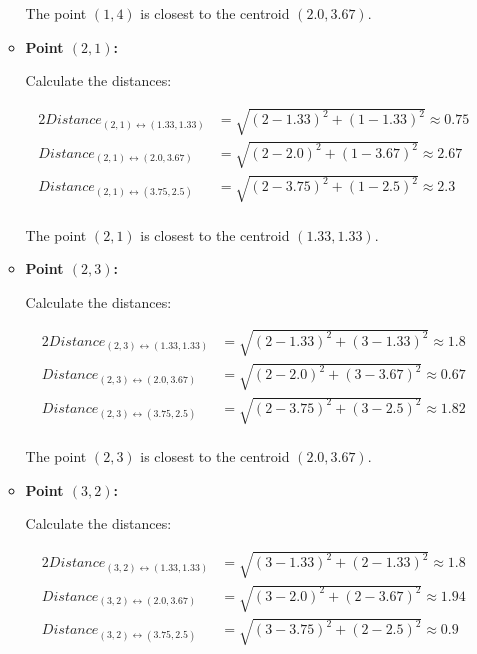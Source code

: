\documentclass[
english,
smallborders
]{i6prcsht}
\begin{document}
\begin{solution}
\begin{enumerate}
\begin{itemize}
			            The point $(1,4)$ is closest to the centroid $(2.0,3.67)$.
			            
			      \item \textbf{Point $(2,1)$:}
			            
			            Calculate the distances:
			            
			            \begin{alignat*}{2}
				            Distance_{(2,1)\leftrightarrow(1.33,1.33)} & = \sqrt{(2-1.33)^2+(1-1.33)^2} \approx 0.75 \\
				            Distance_{(2,1)\leftrightarrow(2.0,3.67)}  & = \sqrt{(2-2.0)^2+(1-3.67)^2} \approx 2.67  \\
				            Distance_{(2,1)\leftrightarrow(3.75,2.5)}  & = \sqrt{(2-3.75)^2+(1-2.5)^2} \approx 2.3   \\
			            \end{alignat*}
			            
			            The point $(2,1)$ is closest to the centroid $(1.33,1.33)$.
			            
			      \item \textbf{Point $(2,3)$:}
			            
			            Calculate the distances:
			            
			            \begin{alignat*}{2}
				            Distance_{(2,3)\leftrightarrow(1.33,1.33)} & = \sqrt{(2-1.33)^2+(3-1.33)^2} \approx 1.8 \\
				            Distance_{(2,3)\leftrightarrow(2.0,3.67)}  & = \sqrt{(2-2.0)^2+(3-3.67)^2} \approx 0.67 \\
				            Distance_{(2,3)\leftrightarrow(3.75,2.5)}  & = \sqrt{(2-3.75)^2+(3-2.5)^2} \approx 1.82 \\
			            \end{alignat*}
			            
			            The point $(2,3)$ is closest to the centroid $(2.0,3.67)$.
			            
			      \item \textbf{Point $(3,2)$:}
			            
			            Calculate the distances:
			            
			            \begin{alignat*}{2}
				            Distance_{(3,2)\leftrightarrow(1.33,1.33)} & = \sqrt{(3-1.33)^2+(2-1.33)^2} \approx 1.8 \\
				            Distance_{(3,2)\leftrightarrow(2.0,3.67)}  & = \sqrt{(3-2.0)^2+(2-3.67)^2} \approx 1.94 \\
				            Distance_{(3,2)\leftrightarrow(3.75,2.5)}  & = \sqrt{(3-3.75)^2+(2-2.5)^2} \approx 0.9  \\
			            \end{alignat*}
			            

\end{itemize}
\end{enumerate}
\end{solution}
\end{document}
